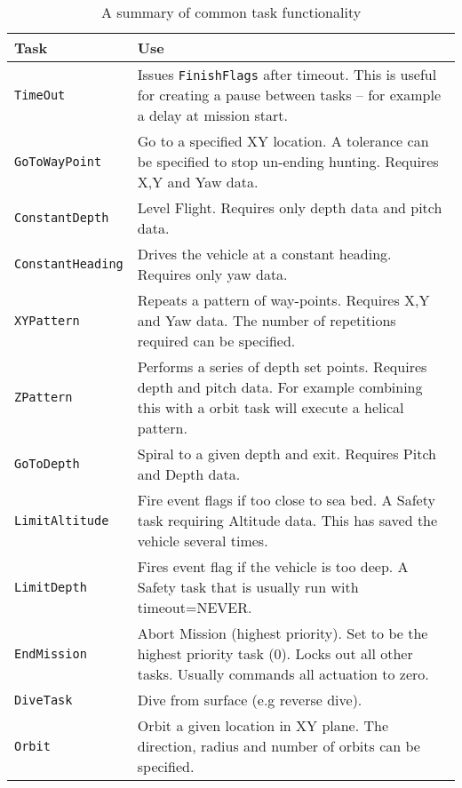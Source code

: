 \documentclass[a4paper,10pt]{article}
\newcommand{\Code}[1]{\texttt{#1} }
\newcommand{\code}[1]{\Code{#1} }
\begin{document}
\begin{table}[ht]\label{tab:TaskSummaries}
\caption{A summary of common task functionality} \centering
%
\begin{tabular}{p{}|p{}}

{\textbf{Task}}  &  {\textbf{Use}} \\ \hline
%
\code{TimeOut} & Issues \code{FinishFlags} after timeout. This is
useful for creating a pause between tasks -- for example a delay at
mission start.
\\%
%
\code{GoToWayPoint} & Go to a specified XY location. A tolerance
can be specified to stop un-ending hunting. Requires X,Y and Yaw
data.
\\%
%
\code{ConstantDepth}  & Level Flight. Requires only depth data and
pitch data.
\\%
%
\code{ConstantHeading} & Drives the vehicle at a constant heading.
Requires only yaw data.
\\%
%
\code{XYPattern} & Repeats a pattern of way-points. Requires X,Y
and Yaw data. The number of repetitions required can be specified.
\\%
%
\code{ZPattern} & Performs a series of depth set points. Requires
depth and pitch data. For example combining this with a orbit task
will execute a helical pattern.
\\%
%
\code{GoToDepth} & Spiral to a given depth and exit. Requires
Pitch and Depth data.
\\%
%
\code{LimitAltitude} & Fire event flags if too close to sea bed. A
Safety task requiring Altitude data. This has saved the vehicle
several times.
\\%
%
\code{LimitDepth} & Fires event flag if the vehicle is too deep. A
Safety task that is usually run with timeout=NEVER.
\\%
%
\code{EndMission} & Abort Mission (highest priority). Set to be
the highest priority task (0). Locks out all other tasks. Usually
commands all actuation to zero.
\\%
%
\code{DiveTask}  & Dive from surface (e.g reverse dive). \\%
%
\code{Orbit} & Orbit a given location in XY plane. The direction, radius and number of orbits can be specified. \\%

\end{tabular}
\end{table}
\end{document}
